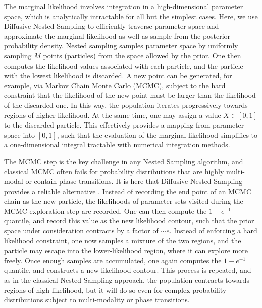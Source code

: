 \documentclass[12pt]{emulateapj}
\begin{document}
The marginal likelihood involves integration in a high-dimensional parameter space, which is analytically intractable for all but the
simplest cases. Here, we use Diffusive Nested Sampling \citep{brewer2011} to efficiently traverse parameter space and approximate the marginal 
likelihood as well as sample from the posterior probability density. 
Nested sampling \citep{skilling2006} samples parameter space by uniformly sampling $M$ points (particles) from the space allowed by the prior. 
One then computes the likelihood values associated with each particle, and the particle with the lowest likelihood is discarded. A new point
can be generated, for example, via Markov Chain Monte Carlo (MCMC), subject to the hard constraint that the
likelihood of the new point must be larger than the likelihood of the discarded one. In this way, the population iterates progressively towards
regions of higher likelihood. At the same time, one may assign a value $X  \in [0, 1]$ to the discarded particle. This effectively provides a 
mapping from parameter space into $[0,1]$, such that the evaluation of the marginal likelihood simplifies to a one-dimensional 
integral tractable with numerical integration methods.

The MCMC step is the key challenge in any Nested Sampling algorithm, and classical MCMC often fails for probability distributions that
are highly multi-modal or contain phase transitions. It is here that Diffusive Nested Sampling provides a reliable alternative \citep[for details, see][]{brewer2011}. 
Instead of recording the end point of an MCMC chain as the new particle, the likelihoods of parameter sets visited during the MCMC exploration step
 are recorded. One can then compute the $1-e^{-1}$ quantile, and record this value as the new likelihood contour, such that the prior space
 under consideration contracts by a factor of $\sim e$. Instead of enforcing a hard likelihood constraint, one now samples a mixture of the 
 two regions, and the particle may escape into the lower-likelihood region, where it can explore more freely. Once enough samples are accumulated,
 one again computes the $1-e^{-1}$ quantile, and constructs a new likelihood contour. This process is repeated, and as in the classical Nested Sampling
 approach, the population contracts towards regions of high likelihood, but it will do so even for complex probability distributions subject to multi-modality
 or phase transitions.
\end{document}
